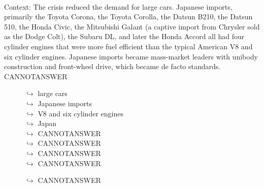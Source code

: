 \documentclass[11pt,a4paper, onecolumn]{article}
\begin{document}
\\ Context: The crisis reduced the demand for large cars. Japanese imports, primarily the Toyota Corona, the Toyota Corolla, the Datsun B210, the Datsun 510, the Honda Civic, the Mitsubishi Galant (a captive import from Chrysler sold as the Dodge Colt), the Subaru DL, and later the Honda Accord all had four cylinder engines that were more fuel efficient than the typical American V8 and six cylinder engines. Japanese imports became mass-market leaders with unibody construction and front-wheel drive, which became de facto standards. CANNOTANSWER

\begin{figure}[t] \small \begin{tcolorbox}[boxsep=0pt,left=5pt,right=0pt,top=2pt,colback = yellow!5] \begin{dialogue}
 \small 
\colorbox{pink!25}{$\hookrightarrow$}
{ large cars }
\\
\colorbox{pink!25}{$\hookrightarrow$}
{ Japanese imports }
\\
\colorbox{pink!25}{$\hookrightarrow$}
{ V8 and six cylinder engines }
\\
\colorbox{pink!25}{$\hookrightarrow$}
{ Japan }
\\
\colorbox{pink!25}{$\hookrightarrow$}
{ CANNOTANSWER }
\\
\colorbox{pink!25}{$\hookrightarrow$}
{ CANNOTANSWER }
\\
\colorbox{pink!25}{$\hookrightarrow$}
{ CANNOTANSWER }
\\
\colorbox{pink!25}{$\hookrightarrow$}
{ CANNOTANSWER }
 \end{dialogue}\end{tcolorbox}\end{figure}\begin{figure}[t] \small \begin{tcolorbox}[boxsep=0pt,left=5pt,right=0pt,top=2pt,colback = yellow!5] \begin{dialogue}
 \small 
\colorbox{pink!25}{$\hookrightarrow$}
{ CANNOTANSWER }
\\
 \end{dialogue}\end{tcolorbox}\end{figure}
\end{document}
